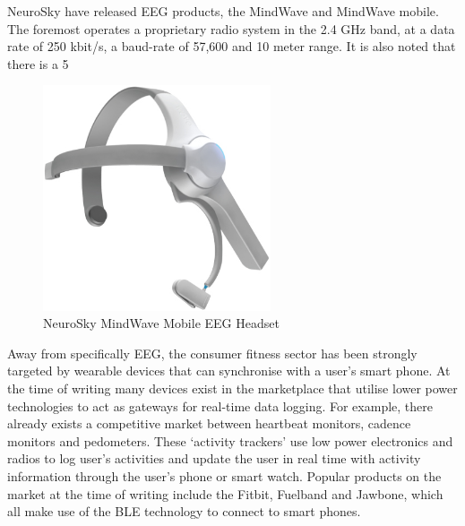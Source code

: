 \documentclass[]{article}
\begin{document}
NeuroSky have released \ac{EEG} products, the MindWave and MindWave mobile. The foremost operates a proprietary radio system in the 2.4 GHz band, at a data rate of 250 kbit/s, a baud-rate of 57,600 and 10 meter range. It is also noted that there is a 5%

\begin{figure}[H]
	\begin{center}
		\includegraphics[width = 0.6\textwidth]{neurosky}
	\end{center}
	\caption{NeuroSky MindWave Mobile \ac{EEG}  Headset}
	\label{fig:neurosky}
\end{figure}

Away from specifically \ac{EEG}, the consumer fitness sector has been strongly targeted by wearable devices that can synchronise with a user's smart phone. At the time of writing many devices exist in the marketplace that utilise lower power technologies to act as gateways for real-time data logging. For example, there already exists a competitive market between heartbeat monitors, cadence monitors and pedometers. These ‘activity trackers’ use low power electronics and radios to log user's activities and update the user in real time with activity information through the user's phone or smart watch. Popular products on the market at the time of writing include the Fitbit, Fuelband and Jawbone, which all make use of the \ac{BLE} technology to connect to smart phones.
\end{document}
